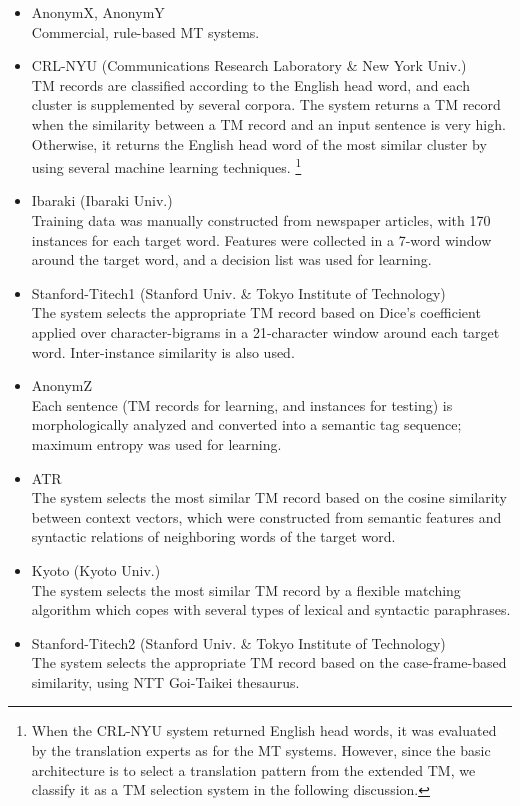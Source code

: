 \begin{itemize}
\item AnonymX, AnonymY \\
  Commercial, rule-based MT systems.
\item CRL-NYU (Communications Research Laboratory \& New York Univ.)
  \cite{Uchimoto03}\\
  TM records are classified according to the English head word, and each
  cluster is supplemented by several corpora. The system returns a TM
  record when the similarity between a TM record and an input sentence
  is very high.  Otherwise, it returns the English head word of the most
  similar cluster by using several machine learning techniques.
  \footnote{ When the CRL-NYU system returned English head words, it was
    evaluated by the translation experts as for the MT systems. However,
    since the basic architecture is to select a translation pattern from
    the extended TM, we classify it as a TM selection system in the
    following discussion.}
\item Ibaraki (Ibaraki Univ.) \cite{Shinnou01} \\
  Training data was manually constructed from newspaper articles, with
  170 instances for each target word.  Features were collected in a
  7-word window around the target word, and a decision list was used for
  learning.
\item Stanford-Titech1 (Stanford Univ. \& Tokyo Institute of
  Technology) \cite{Baldwin01} \\
  The system selects the appropriate TM record based on Dice's
  coefficient applied over character-bigrams in a 21-character window
  around each target word. Inter-instance similarity is also used.
\item AnonymZ \\
  Each sentence (TM records for learning, and instances for testing) is
  morphologically analyzed and converted into a semantic tag
  sequence; maximum entropy was used for learning.
\item ATR \cite{Kumano03}\\
  The system selects the most similar TM record based on the cosine
  similarity between context vectors, which were constructed from
  semantic features and syntactic relations of neighboring words of the
  target word.
\item Kyoto (Kyoto Univ.) \\
  The system selects the most similar TM record by a flexible  matching
  algorithm which copes with several types of lexical and syntactic
  paraphrases.
\item Stanford-Titech2 (Stanford Univ. \& Tokyo Institute of
  Technology) \cite{Baldwin01} \\
  The system selects the appropriate TM record based on  the
  case-frame-based similarity, using NTT Goi-Taikei thesaurus.
\end{itemize}

